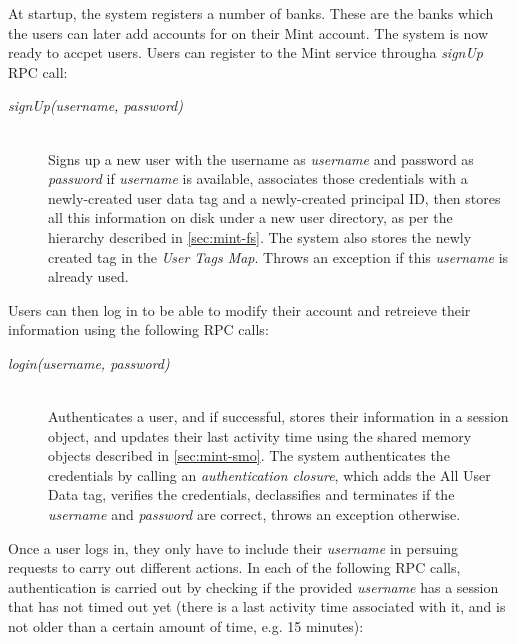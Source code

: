 At startup, the system registers a number of banks. These are the banks which the users can later add accounts for on their Mint account. The system is now ready to accpet users. Users can register to the Mint service througha \emph{signUp} RPC call:

\begin{description}
  \item[\emph{signUp(username, password)}] \ \\
    Signs up a new user with the username as 
    \emph{username} and password as \emph{password} 
    if \emph{username} is available, associates 
    those credentials with a newly-created user data 
    tag and a newly-created principal ID,
    then stores all this information on disk under
    a new user directory, as per the hierarchy
    described in \ref{sec:mint-fs}. The system
    also stores the newly created tag in the 
    \emph{User Tags Map}.
    Throws an exception if this \emph{username}
    is already used.
\end{description}

Users can then log in to be able to modify their account and retreieve their information using the following RPC calls:

\begin{description}
  \item[\emph{login(username, password)}] \ \\
    Authenticates a user, and if successful, 
    stores their information in a session 
    object, and updates their last activity
    time using the shared memory objects
    described in \ref{sec:mint-smo}.
    The system authenticates the 
    credentials by calling an 
    \emph{authentication closure}, which 
    adds the All User Data tag, 
    verifies the credentials, declassifies 
    and terminates if the \emph{username} and
    \emph{password} are correct, throws 
    an exception otherwise.
\end{description}

Once a user logs in, they only have to include their \emph{username} in persuing requests to carry out different actions. In each of the following RPC calls, authentication is carried out by checking if the provided \emph{username} has a session that has not timed out yet (there is a last activity time associated with it, and is not older than a certain amount of time, e.g. 15 minutes):

